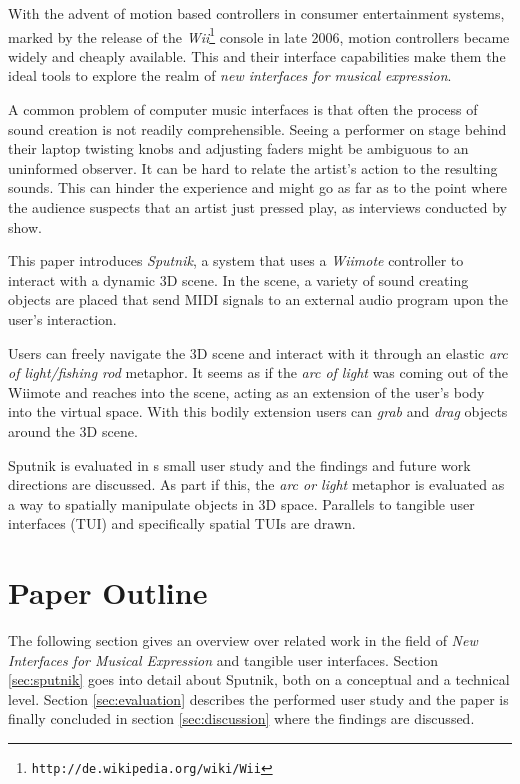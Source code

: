 \documentclass[10pt,a4paper]{scrartcl}
\begin{document}
With the advent of motion based controllers in consumer entertainment systems, marked by the release of the \emph{Wii}\footnote{\texttt{http://de.wikipedia.org/wiki/Wii}} console in late 2006, motion controllers became widely and cheaply available. This and their interface capabilities make them the ideal tools to explore the realm of \emph{new interfaces for musical expression}.


A common problem of computer music interfaces is that often the process of sound creation is not readily comprehensible. Seeing a performer on stage behind their laptop twisting knobs and adjusting faders might be ambiguous to an uninformed observer. It can be hard to relate the artist's action to the resulting sounds. This can hinder the experience and might go as far as to the point where the audience suspects that an artist just pressed play, as interviews conducted by \cite{Pedersen2009} show.

This paper introduces \emph{Sputnik}, a system that uses a \emph{Wiimote} controller to interact with a dynamic 3D scene. In the scene, a variety of sound creating objects are placed that send MIDI signals to an external audio program upon the user's interaction. 

Users can freely navigate the 3D scene and interact with it through an elastic \emph{arc of light/fishing rod} metaphor. It seems as if the \emph{arc of light} was coming out of the Wiimote and reaches into the scene, acting as an extension of the user's body into the virtual space. With this bodily extension users can \emph{grab} and \emph{drag} objects around the 3D scene.



Sputnik is evaluated in s small user study and the findings and future work directions are discussed. As part if this, the \emph{arc or light} metaphor is evaluated as a way to spatially manipulate objects in 3D space. Parallels to tangible user interfaces (TUI)\cite{Ishii1997} and specifically spatial TUIs\cite{Sharlin2004} are drawn. 


\section{Paper Outline}
The following section gives an overview over related work in the field of \emph{New Interfaces for Musical Expression} and tangible user interfaces. Section \ref{sec:sputnik} goes into detail about Sputnik, both on a conceptual and a technical level. Section \ref{sec:evaluation} describes the performed user study and the paper is finally concluded in section \ref{sec:discussion} where the findings are discussed.
\end{document}
